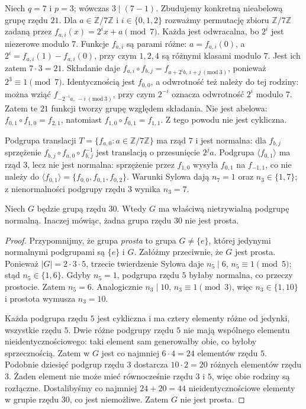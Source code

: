 \begin{przyklad}
Niech $q=7$ i $p=3$; wówczas $3\mid(7-1)$.
Zbudujemy konkretną nieabelową grupę rzędu $21$.
Dla $a\in\mathbb Z/7\mathbb Z$ i $i\in\{0,1,2\}$
rozważmy permutację zbioru $\mathbb Z/7\mathbb Z$
zadaną przez
$f_{a,i}(x)=2^i x+a\pmod7$.
Każda jest odwracalna, bo $2^i$ jest niezerowe modulo $7$.
Funkcje $f_{a,i}$ są parami różne: $a=f_{a,i}(0)$,
a $2^i=f_{a,i}(1)-f_{a,i}(0)$, przy czym $1,2,4$
są różnymi klasami modulo $7$.
Jest ich zatem $7\cdot3=21$.
Składanie daje
$f_{a,i}\circ f_{b,j}=f_{a+2^ib,\,i+j\ (\mathrm{mod}\ 3)}$,
ponieważ $2^3\equiv1\pmod7$.
Identycznością jest $f_{0,0}$, a odwrotność też należy
do tej rodziny: można wziąć
$f_{-2^{-i}a,\,-i\ (\mathrm{mod}\ 3)}$,
przy czym $2^{-i}$ oznacza odwrotność $2^i$ modulo $7$.
Zatem te $21$ funkcji tworzy grupę względem składania.
Nie jest abelowa:
$f_{0,1}\circ f_{1,0}=f_{2,1}$,
natomiast $f_{1,0}\circ f_{0,1}=f_{1,1}$.
Z tego powodu nie jest cykliczna.

Podgrupa translacji $T=\{f_{a,0}:a\in\mathbb Z/7\mathbb Z\}$
ma rząd $7$ i jest normalna: dla $f_{b,j}$ sprzężenie
$f_{b,j}\circ f_{a,0}\circ f_{b,j}^{-1}$ jest translacją
o przesunięcie $2^j a$.
Podgrupa $\langle f_{0,1}\rangle$ ma rząd $3$,
lecz nie jest normalna: sprzężenie przez $f_{1,0}$
wysyła $f_{0,1}$ na $f_{-1,1}$, co nie należy
do $\langle f_{0,1}\rangle=\{f_{0,0},f_{0,1},f_{0,2}\}$.
Warunki Sylowa dają $n_7=1$ oraz $n_3\in\{1,7\}$;
z nienormalności podgrupy rzędu $3$ wynika $n_3=7$.
\end{przyklad}

\begin{twierdzenie}
\label{aa:tw:30-not-simple}
Niech $G$ będzie grupą rzędu $30$. Wtedy $G$ ma
właściwą nietrywialną podgrupę normalną.
Inaczej mówiąc, żadna grupa rzędu $30$ nie jest prosta.
\end{twierdzenie}
\begin{proof}
Przypomnijmy, że grupa \emph{prosta} to grupa $G\ne\{e\}$,
której jedynymi normalnymi podgrupami są $\{e\}$ i $G$.
Załóżmy przeciwnie, że $G$ jest prosta.
Ponieważ $|G|=2\cdot3\cdot5$,
trzecie twierdzenie Sylowa daje
$n_5\mid6$, $n_5\equiv1\pmod5$;
stąd $n_5\in\{1,6\}$.
Gdyby $n_5=1$, podgrupa rzędu $5$ byłaby normalna,
co przeczy prostocie. Zatem $n_5=6$.
Analogicznie $n_3\mid10$, $n_3\equiv1\pmod3$,
więc $n_3\in\{1,10\}$ i prostota wymusza $n_3=10$.

Każda podgrupa rzędu $5$ jest cykliczna i ma cztery
elementy różne od jedynki, wszystkie rzędu $5$.
Dwie różne podgrupy rzędu $5$ nie mają wspólnego
elementu nieidentycznościowego: taki element sam generowałby
obie, co byłoby sprzecznością.
Zatem w $G$ jest co najmniej $6\cdot4=24$
elementów rzędu $5$.
Podobnie dziesięć podgrup rzędu $3$ dostarcza
$10\cdot2=20$ różnych elementów rzędu $3$.
Żaden element nie może mieć równocześnie rzędu $3$ i $5$,
więc obie rodziny są rozłączne.
Dostalibyśmy co najmniej $24+20=44$ nieidentycznościowe
elementy w grupie rzędu $30$, co jest niemożliwe.
Zatem $G$ nie jest prosta.
\end{proof}

